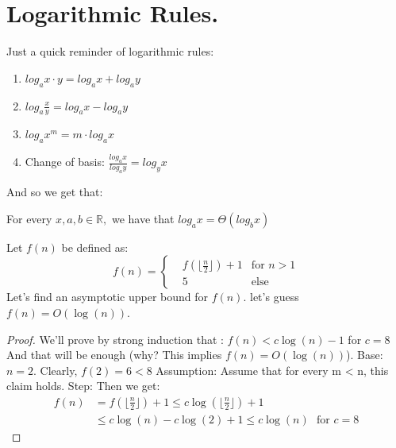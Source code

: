 \section{Logarithmic Rules.}

Just a quick reminder of logarithmic rules:
\begin{enumerate}
\item $log_{a}x\cdot y=log_{a}x+log_{a}y$
\item $log_{a}\frac{x}{y}=log_{a}x-log_{a}y$
\item $log_{a}x^{m}=m\cdot log_{a}x$
\item Change of basis: $\frac{log_{a}x}{log_{a}y}=log_{y}x$
\end{enumerate}
And so we get that:
\begin{remark}
For every $x,a,b\in\mathbb{R},$ we have that $log_{a}x=\Theta(log_{b}x)$
\end{remark}

\begin{example} Let \(f(n)\) be defined as:
\begin{equation*}
f(n) = \left\{ \begin{array}{rcl}
& f\left( \lfloor  \frac{n}{2} \rfloor \right) + 1 & \mbox{for }  n > 1  \\
& 5 & \mbox{else}  
\end{array}\right.
\end{equation*}
Let’s find an asymptotic upper bound for \(f(n)\). let's guess \( f(n) = O(\log(n)) \).

\begin{proof}  We’ll prove by strong induction that : \(f(n) < c \log(n) - 1\) for \(c =8 \) And that will be enough (why? This implies \(f(n) = O(\log(n))\)).
Base: \(n = 2\). Clearly, \(f(2) = 6 < 8 \)
Assumption: Assume that for every m < n, this claim holds.
Step: Then we get:
\begin{equation*} \begin{split}
    f(n) &= f\left( \lfloor  \frac{n}{2} \rfloor \right) + 1 \le c\log\left(  \lfloor\frac{n}{2}\rfloor\right)  + 1  \\ & \le c\log\left(n\right) - c\log\left(2\right) + 1 
    \le c\log\left(n\right) \ \ \ \text{for } c = 8
\end{split}
\end{equation*}
\end{proof}
\end{example}



